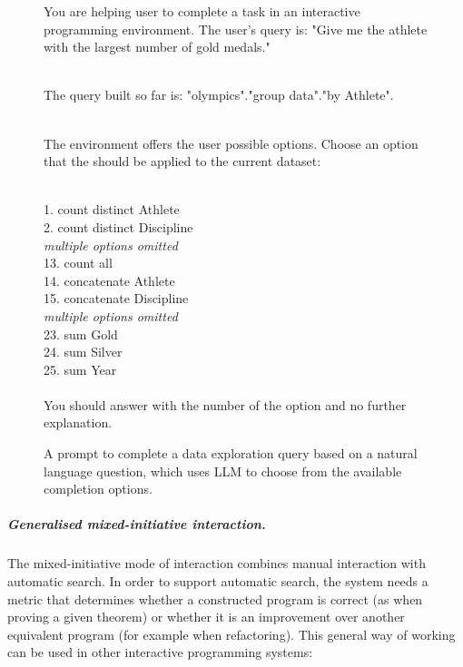 \documentclass[ a4paper,UKenglish,cleveref, autoref, thm-restate]{lipics-v2021}
\begin{document}
\begin{figure}[t]
{\raggedright\ttfamily\small
You are helping user to complete a task in an interactive programming environment. The user's
query is: "Give me the athlete with the largest number of gold medals."

~\\[-0.75em]

The query built so far is: "olympics"."group data"."by Athlete".

~\\[-0.75em]

The environment offers the user possible options. Choose an option that the should be applied to the current dataset:

~\\[-0.75em]

1.\hspace{0.4em} count distinct Athlete\\
2.\hspace{0.4em} count distinct Discipline\\
\hspace{2.3em}\lbrack\textit{multiple options omitted}\rbrack \\
13. count all\\
14. concatenate Athlete\\
15. concatenate Discipline\\
\hspace{2.3em}\lbrack\textit{multiple options omitted}\rbrack\\
23. sum Gold\\
24. sum Silver\\
25. sum Year\\

~\\[-0.75em]

You should answer with the number of the option and no further explanation.}
\caption{A prompt to complete a data exploration query based on a natural language
question, which uses LLM to choose from the available completion options.}
\label{fig:llm}
\end{figure}


\subparagraph{Generalised mixed-initiative interaction.}
The mixed-initiative mode of interaction combines manual interaction with automatic search.
In order to support automatic search, the system needs a metric that determines whether a
constructed program is correct (as when proving a given theorem) or whether it is an improvement
over another equivalent program (for example when refactoring). This general way of working
can be used in other interactive programming systems:
\end{document}

